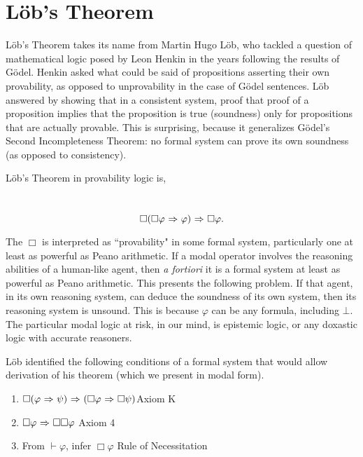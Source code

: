 \section{L\"ob's Theorem}
\label{sec:lob_section}
L\"ob's Theorem takes its name from Martin Hugo L\"ob, who tackled a question of mathematical logic posed by Leon Henkin in the years following the results of G\"odel. Henkin asked what could be said of propositions asserting their own provability, as opposed to unprovability in the case of G\"odel sentences.\cite{sep_prov_log} L\"ob answered by showing that in a consistent system, proof that proof of a proposition implies that the proposition is true (soundness) only for propositions that are actually provable. This is surprising, because it generalizes G\"odel's Second Incompleteness Theorem: no formal system can prove its own soundness (as opposed to consistency).

L\"ob's Theorem in provability logic is,
\begin{center}~\label{lob}
	\begin{equation}
	\Box(\Box\varphi {\ \Rightarrow \ } \varphi){\ \Rightarrow \ } \Box\varphi.
	\end{equation}
\end{center}
The $\Box$ is interpreted as ``provability" in some formal system, particularly one at least as powerful as Peano arithmetic. If a modal operator involves the reasoning abilities of a human-like agent, then \emph{a fortiori} it is a formal system at least as powerful as Peano arithmetic. This presents the following problem. If that agent, in its own reasoning system, can deduce the soundness of its own system, then its reasoning system is unsound. This is because $\varphi$ can be any formula, including $\bot$. The particular modal logic at risk, in our mind, is epistemic logic, or any doxastic logic with accurate reasoners.

L\"ob identified the following conditions of a formal system that would allow derivation of his theorem (which we present in modal form).
\begin{enumerate}
	\item $\Box(\varphi {\ \Rightarrow \ } \psi) {\ \Rightarrow \ } (\Box\varphi {\ \Rightarrow \ } \Box \psi)$\mbox{}\hfill Axiom K
	\item $\Box\varphi {\ \Rightarrow \ } \Box\Box\varphi$ \mbox{}\hfill Axiom 4
	\item From $\vdash \varphi$, infer $\Box\varphi$ \mbox{}\hfill Rule of Necessitation
\end{enumerate}

